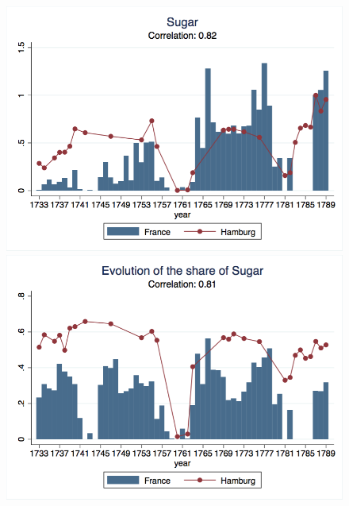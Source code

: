 \documentclass[12pt,a4paper,titlepage,english]{article}
\begin{document}
\begin{figure}
\includegraphics[scale=.28]{sugar_long.png}
\includegraphics[scale=.28]{sugar_share_long.png}\\
\end{figure}
\end{document}

